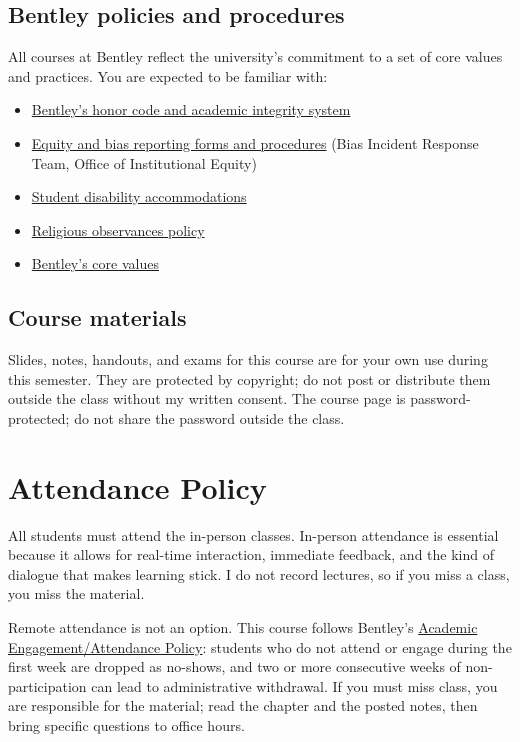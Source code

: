 \documentclass[11pt,letterpaper]{article}
\begin{document}
\subsection*{Bentley policies and procedures}
All courses at Bentley reflect the university's commitment to a set of core values and practices. You are expected to be familiar with:
\begin{itemize}
    \item \href{https://catalog.bentley.edu/undergraduate/academic-policies-procedures/}{Bentley's honor code and academic integrity system}
    \item \href{https://www.bentley.edu/equity-reporting}{Equity and bias reporting forms and procedures} (Bias Incident Response Team, Office of Institutional Equity)
    \item \href{https://www.bentley.edu/offices/student-accessibility-services}{Student disability accommodations}
    \item \href{https://catalog.bentley.edu/undergraduate/academic-policies-procedures/}{Religious observances policy}
    \item \href{https://www.bentley.edu/about/mission-and-values}{Bentley's core values}
\end{itemize}

\subsection*{Course materials}
Slides, notes, handouts, and exams for this course are for your own use during this semester. They are protected by copyright; do not post or distribute them outside the class without my written consent. The course page is password-protected; do not share the password outside the class.

\section*{Attendance Policy}

All students must attend the in-person classes. In-person attendance is essential because it allows for real-time interaction, immediate feedback, and the kind of dialogue that makes learning stick. I do not record lectures, so if you miss a class, you miss the material.

Remote attendance is not an option. This course follows Bentley's \href{https://catalog.bentley.edu/undergraduate/academic-policies-procedures/}{Academic Engagement/Attendance Policy}: students who do not attend or engage during the first week are dropped as no-shows, and two or more consecutive weeks of non-participation can lead to administrative withdrawal. If you must miss class, you are responsible for the material; read the chapter and the posted notes, then bring specific questions to office hours.
\end{document}
